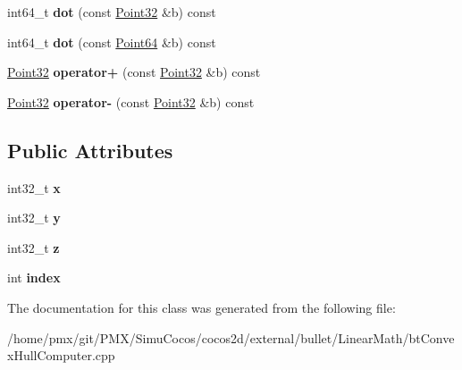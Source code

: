 \begin{DoxyCompactItemize}
\mbox{\label{classbtConvexHullInternal_1_1Point32_a85e77f58bc24ac3a1e62f29730f609c3}} 
int64\+\_\+t {\bfseries dot} (const \hyperlink{classbtConvexHullInternal_1_1Point32}{Point32} \&b) const
\item 
\mbox{\label{classbtConvexHullInternal_1_1Point32_a2ddfe7ed240443e2425f5544f4c3b2ad}} 
int64\+\_\+t {\bfseries dot} (const \hyperlink{classbtConvexHullInternal_1_1Point64}{Point64} \&b) const
\item 
\mbox{\label{classbtConvexHullInternal_1_1Point32_aaace0e17117f78a00f09714f2103d5d4}} 
\hyperlink{classbtConvexHullInternal_1_1Point32}{Point32} {\bfseries operator+} (const \hyperlink{classbtConvexHullInternal_1_1Point32}{Point32} \&b) const
\item 
\mbox{\label{classbtConvexHullInternal_1_1Point32_a6f662d283c47faec63a19becb7988153}} 
\hyperlink{classbtConvexHullInternal_1_1Point32}{Point32} {\bfseries operator-\/} (const \hyperlink{classbtConvexHullInternal_1_1Point32}{Point32} \&b) const
\end{DoxyCompactItemize}
\subsection*{Public Attributes}
\begin{DoxyCompactItemize}
\item 
\mbox{\label{classbtConvexHullInternal_1_1Point32_aa3e308a9182ba4a4bc721f60a559a478}} 
int32\+\_\+t {\bfseries x}
\item 
\mbox{\label{classbtConvexHullInternal_1_1Point32_a2a44c925f86a8a90f36a936519a833e8}} 
int32\+\_\+t {\bfseries y}
\item 
\mbox{\label{classbtConvexHullInternal_1_1Point32_a4dc7e60d34a566c0a407d42b63823162}} 
int32\+\_\+t {\bfseries z}
\item 
\mbox{\label{classbtConvexHullInternal_1_1Point32_ad61df6f74c1456243c578e1ea96c9a2f}} 
int {\bfseries index}
\end{DoxyCompactItemize}


The documentation for this class was generated from the following file\+:\begin{DoxyCompactItemize}
\item 
/home/pmx/git/\+P\+M\+X/\+Simu\+Cocos/cocos2d/external/bullet/\+Linear\+Math/bt\+Convex\+Hull\+Computer.\+cpp\end{DoxyCompactItemize}
